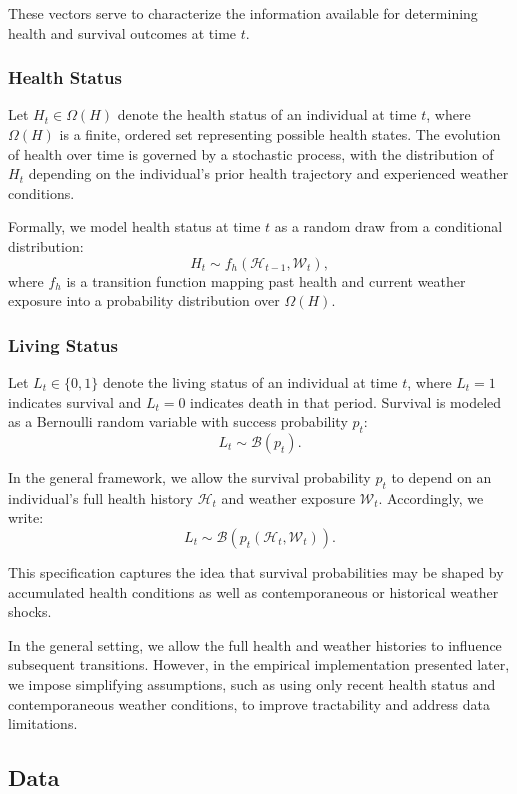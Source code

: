 \documentclass{article}
\begin{document}
These vectors serve to characterize the information available for determining health and survival outcomes at time $t$.

\subsubsection{Health Status}

Let $H_t \in \Omega(H)$ denote the health status of an individual at time $t$, where $\Omega(H)$ is a finite, ordered set representing possible health states. The evolution of health over time is governed by a stochastic process, with the distribution of $H_t$ depending on the individual's prior health trajectory and experienced weather conditions.

Formally, we model health status at time $t$ as a random draw from a conditional distribution:
\[
H_t \sim f_h(\mathcal{H}_{t-1}, \mathcal{W}_t),
\]
where $f_h$ is a transition function mapping past health and current weather exposure into a probability distribution over $\Omega(H)$.

\subsubsection{Living Status}

Let $L_t \in \{0,1\}$ denote the living status of an individual at time $t$, where $L_t = 1$ indicates survival and $L_t = 0$ indicates death in that period. Survival is modeled as a Bernoulli random variable with success probability $p_t$:
\[
L_t \sim \mathcal{B}(p_t).
\]

In the general framework, we allow the survival probability $p_t$ to depend on an individual's full health history $\mathcal{H}_t$ and weather exposure $\mathcal{W}_t$. Accordingly, we write:
\[
L_t \sim \mathcal{B}(p_t(\mathcal{H}_t, \mathcal{W}_t)).
\]

This specification captures the idea that survival probabilities may be shaped by accumulated health conditions as well as contemporaneous or historical weather shocks.

In the general setting, we allow the full health and weather histories to influence subsequent transitions.
However, in the empirical implementation presented later, we impose simplifying assumptions, such as using only recent health status and contemporaneous weather conditions, 
to improve tractability and address data limitations.

\subsection{Data}\label{data}
\end{document}
